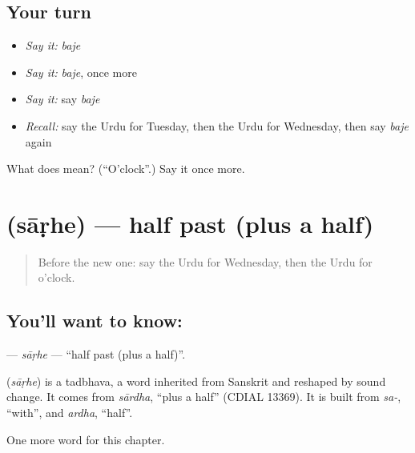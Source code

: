 \subsection*{Your turn}
\begin{itemize}
\raggedright
  \item \emph{Say it:} \emph{baje}
  \item \emph{Say it:} \emph{baje}, once more
  \item \emph{Say it:} say \emph{baje}
  \item \emph{Recall:} say the Urdu for Tuesday, then the Urdu for Wednesday, then say \emph{baje} again
\end{itemize}

\begin{tcolorbox}[breakable,colback=teal!4,colframe=teal!35!black,title={Before you move on}]
What does  mean? (\textquotedblleft{}O'clock\textquotedblright{}.) Say it once more.
\end{tcolorbox}
\section[\texorpdfstring{\ur{ساڑھے} (sāṛhe)}{ساڑھے (sāṛhe)}]{ (sāṛhe) — half past (plus a half)}

\label{lesson:UR-C92-sarhe}



\begin{quote}
Before the new one: say the Urdu for Wednesday, then the Urdu for o'clock.
\end{quote}

\subsection*{You'll want to know: }
\textbf{} — \emph{sāṛhe} — \textquotedblleft{}half past (plus a half)\textquotedblright{}.

\begin{cousinweb}
\textbf{} (\emph{sāṛhe}) is a tadbhava, a word inherited from Sanskrit and reshaped by sound change. It comes from \emph{sārdha}, \textquotedblleft{}plus a half\textquotedblright{} (CDIAL 13369). It is built from \emph{sa-}, \textquotedblleft{}with\textquotedblright{}, and \emph{ardha}, \textquotedblleft{}half\textquotedblright{}.
\end{cousinweb}

\begin{grammarlens}[title={What you've built}]
One more word for this chapter.
\end{grammarlens}

